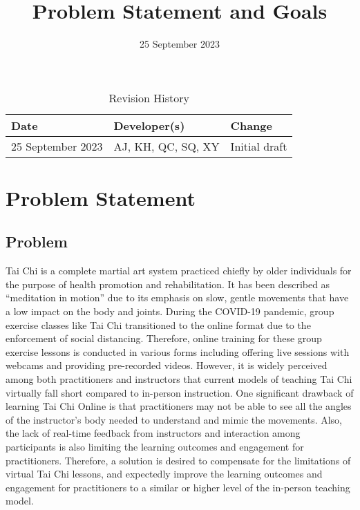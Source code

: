 \documentclass{article}
\title{Problem Statement and Goals\\\progname}
\author{\authname}
\date{25 September 2023}
\begin{document}
\maketitle

\begin{table}[hp]
  \caption{Revision History} \label{TblRevisionHistory}
  \begin{tabularx}{\textwidth}{llX}
    \toprule
    \textbf{Date} & \textbf{Developer(s)} & \textbf{Change}\\
    \midrule
    25 September 2023 & AJ, KH, QC, SQ, XY & Initial draft \\
    \bottomrule
  \end{tabularx}
\end{table}

\section{Problem Statement}

\subsection{Problem}

Tai Chi is a complete martial art system practiced chiefly by older individuals
for the purpose of health promotion and rehabilitation. It has been described as
“meditation in motion” due to its emphasis on slow, gentle movements that have a
low impact on the body and joints. During the COVID-19 pandemic, group exercise
classes like Tai Chi transitioned to the online format due to the enforcement of
social distancing. Therefore, online training for these group exercise lessons
is conducted in various forms including offering live sessions with webcams and
providing pre-recorded videos. However, it is widely perceived among both
practitioners and instructors that current models of teaching Tai Chi virtually
fall short compared to in-person instruction. One significant drawback of
learning Tai Chi Online is that practitioners may not be able to see all the
angles of the instructor’s body needed to understand and mimic the movements.
Also, the lack of real-time feedback from instructors and interaction among
participants is also limiting the learning outcomes and engagement for
practitioners. Therefore, a solution is desired to compensate for the
limitations of virtual Tai Chi lessons, and expectedly improve the learning
outcomes and engagement for practitioners to a similar or higher level of the
in-person teaching model.
\end{document}
